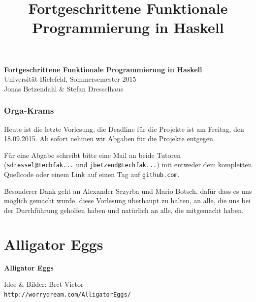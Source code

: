 \documentclass{beamer}
\title{Fortgeschrittene Funktionale Programmierung in Haskell}
\begin{document}
  

  \begin{frame}
  \begin{center}
    \huge\textbf{Fortgeschrittene Funktionale Programmierung in Haskell}\\ \bigskip
    \LARGE Universität Bielefeld, Sommersemester 2015\\ \bigskip
    \large Jonas Betzendahl \& Stefan Dresselhaus
    \end{center}
  \end{frame}
  

\begin{frame}
\frametitle{Orga-Krams}

Heute ist die letzte Vorlesung, die Deadline für die Projekte ist am Freitag, den 18.09.2015. Ab sofort nehmen wir Abgaben für die Projekte entgegen.

Für eine Abgabe schreibt bitte eine Mail an beide Tutoren (\texttt{sdressel@techfak...} und \texttt{jbetzend@techfak...}) mit entweder dem kompletten Quellcode oder einem Link auf einen Tag auf \texttt{github.com}.\pause\bigskip

Besonderer Dank geht an Alexander Sczyrba und Mario Botsch, dafür dass es uns möglich gemacht wurde, diese Vorlesung überhaupt zu halten, an alle, die uns bei der Durchführung geholfen haben und natürlich an alle, die mitgemacht haben. 
\end{frame}

\section*{Alligator Eggs}

\begin{frame}

\begin{center}
\Large \textbf{Alligator Eggs} \tiny \bigskip

Idee \& Bilder: Bret Victor\\
\texttt{http://worrydream.com/AlligatorEggs/}
\end{center}

\end{frame}
\end{document}
